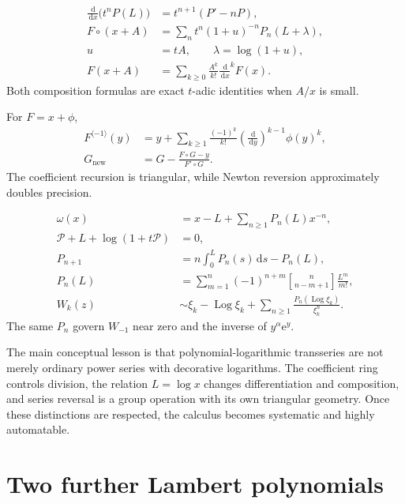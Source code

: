 \documentclass[11pt]{article}
\theoremstyle{pltheorem}
\newcommand{\dd}{\,\mathrm d}
\newcommand{\e}{\mathrm e}
\newcommand{\Log}{\operatorname{Log}}
\newcommand{\rev}{\langle-1\rangle}
\newcommand{\stirlingone}[2]{\genfrac{[}{]}{0pt}{}{#1}{#2}}
\newcommand{\D}{\frac{\dd}{\dd x}}
\newcommand{\compose}{\mathbin{\circ}}
\begin{document}
\begin{keybox}
\begin{align*}
 \D\bigl(t^nP(L)\bigr)&=t^{n+1}(P'-nP),\\
 F\compose(x+A)
 &=\sum_n t^n(1+u)^{-n}P_n(L+\lambda),\\
 u&=tA,\qquad \lambda=\log(1+u),\\
 F(x+A)&=\sum_{k\ge0}\frac{A^k}{k!}\D^kF(x).
\end{align*}
Both composition formulas are exact \(t\)-adic identities when \(A/x\) is small.
\end{keybox}

\begin{keybox}
For \(F=x+\phi\),
\begin{align*}
 F^{\rev}(y)
 &=y+\sum_{k\ge1}\frac{(-1)^k}{k!}
 \left(\frac{\dd}{\dd y}\right)^{k-1}\phi(y)^k,\\
 G_{\mathrm{new}}
 &=G-\frac{F\compose G-y}{F'\compose G}.
\end{align*}
The coefficient recursion is triangular, while Newton reversion approximately doubles precision.
\end{keybox}

\begin{keybox}
\begin{align*}
 \omega(x)&=x-L+\sum_{n\ge1}P_n(L)x^{-n},\\
 \mathcal P+L+\log(1+t\mathcal P)&=0,\\
 P_{n+1}&=n\int_0^LP_n(s)\dd s-P_n(L),\\
 P_n(L)&=\sum_{m=1}^n(-1)^{n+m}
 \stirlingone{n}{n-m+1}\frac{L^m}{m!},\\
 W_k(z)&\sim\xi_k-\Log\xi_k+
 \sum_{n\ge1}\frac{P_n(\Log\xi_k)}{\xi_k^n}.
\end{align*}
The same \(P_n\) govern \(W_{-1}\) near zero and the inverse of
\(y^\alpha\e^y\).
\end{keybox}

The main conceptual lesson is that polynomial-logarithmic transseries are not merely ordinary power series with decorative logarithms.  The coefficient ring controls division, the relation \(L=\log x\) changes differentiation and composition, and series reversal is a group operation with its own triangular geometry.  Once these distinctions are respected, the calculus becomes systematic and highly automatable.

\appendix

\section{Two further Lambert polynomials}
\label{app:further-P}
\end{document}
